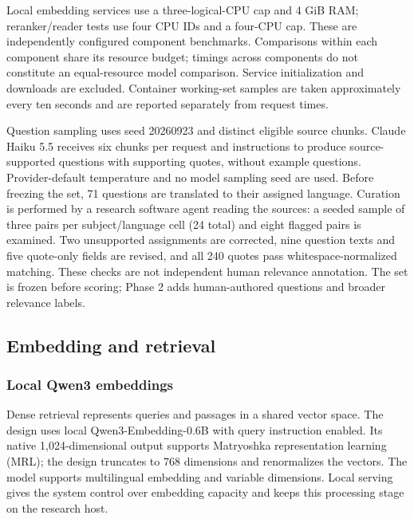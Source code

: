 Local embedding services use a three-logical-CPU cap and 4 GiB RAM; reranker/reader tests use four CPU IDs and a four-CPU cap. These are independently configured component benchmarks. Comparisons within each component share its resource budget; timings across components do not constitute an equal-resource model comparison. Service initialization and downloads are excluded. Container working-set samples are taken approximately every ten seconds and are reported separately from request times.

Question sampling uses seed 20260923 and distinct eligible source chunks. Claude Haiku 5.5 receives six chunks per request and instructions to produce source-supported questions with supporting quotes, without example questions. Provider-default temperature and no model sampling seed are used. Before freezing the set, 71 questions are translated to their assigned language. Curation is performed by a research software agent reading the sources: a seeded sample of three pairs per subject/language cell (24 total) and eight flagged pairs is examined. Two unsupported assignments are corrected, nine question texts and five quote-only fields are revised, and all 240 quotes pass whitespace-normalized matching. These checks are not independent human relevance annotation. The set is frozen before scoring; Phase 2 adds human-authored questions and broader relevance labels.
\subsection{Embedding and retrieval}
\subsubsection{Local Qwen3 embeddings}
Dense retrieval represents queries and passages in a shared vector space. The design uses local Qwen3-Embedding-0.6B with query instruction enabled. Its native 1,024-dimensional output supports Matryoshka representation learning (MRL); the design truncates to 768 dimensions and renormalizes the vectors\citep{qwen}. The model supports multilingual embedding and variable dimensions\citep{qwen}. Local serving gives the system control over embedding capacity and keeps this processing stage on the research host.

